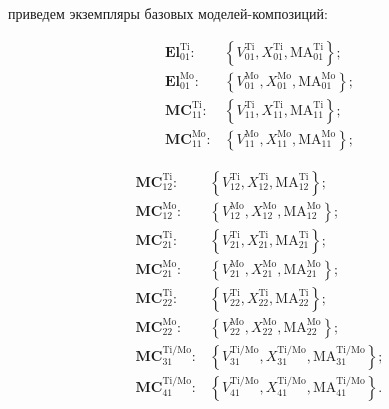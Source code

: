 \begin{multicols}{2}
\vspace*{-3pt}

\noindent
приведем экземпляры базовых мо\-де\-лей-ком\-по\-зи\-ций: 

\vspace*{-9pt}

\noindent
     \begin{align*}
     \mathbf{El}_{01}^{\mathrm{Ti}}:& \left\{ V_{01}^{\mathrm{Ti}}, 
X_{01}^{\mathrm{Ti}}, \mathrm{MA}_{01}^{\mathrm{Ti}}\right\};\\[-3pt]
     \mathbf{El}_{01}^{\mathrm{Mo}}:& \left\{ V_{01}^{\mathrm{Mo}}, 
X_{01}^{\mathrm{Mo}}, \mathrm{MA}_{01}^{\mathrm{Mo}}\right\};\\[-3pt]
\mathbf{MC}_{11}^{\mathrm{Ti}}:& \left\{ V_{11}^{\mathrm{Ti}}, 
X_{11}^{\mathrm{Ti}}, \mathrm{MA}_{11}^{\mathrm{Ti}}\right\};\\[-3pt]
\mathbf{MC}_{11}^{\mathrm{Mo}}:& \left\{ V_{11}^{\mathrm{Mo}}, 
X_{11}^{\mathrm{Mo}}, \mathrm{MA}_{11}^{\mathrm{Mo}}\right\};
\end{align*}

\noindent
\begin{align*}
               \mathbf{MC}_{12}^{\mathrm{Ti}}:& \left\{ V_{12}^{\mathrm{Ti}}, 
X_{12}^{\mathrm{Ti}}, \mathrm{MA}_{12}^{\mathrm{Ti}}\right\};\\
     \mathbf{MC}_{12}^{\mathrm{Mo}}:& \left\{ V_{12}^{\mathrm{Mo}}, 
X_{12}^{\mathrm{Mo}}, \mathrm{MA}_{12}^{\mathrm{Mo}}\right\};\\
     \mathbf{MC}_{21}^{\mathrm{Ti}}:& \left\{ V_{21}^{\mathrm{Ti}}, 
X_{21}^{\mathrm{Ti}}, \mathrm{MA}_{21}^{\mathrm{Ti}}\right\};\\
     \mathbf{MC}_{21}^{\mathrm{Mo}}:& \left\{ V_{21}^{\mathrm{Mo}}, 
X_{21}^{\mathrm{Mo}}, \mathrm{MA}_{21}^{\mathrm{Mo}}\right\};\\
     \mathbf{MC}_{22}^{\mathrm{Ti}}:& \left\{ V_{22}^{\mathrm{Ti}}, 
X_{22}^{\mathrm{Ti}}, \mathrm{MA}_{22}^{\mathrm{Ti}}\right\};\\
     \mathbf{MC}_{22}^{\mathrm{Mo}}:& \left\{ V_{22}^{\mathrm{Mo}}, 
X_{22}^{\mathrm{Mo}}, \mathrm{MA}_{22}^{\mathrm{Mo}}\right\};\\
     \mathbf{MC}_{31}^{\mathrm{Ti}/\mathrm{Mo}}:& \left\{
     V_{31}^{\mathrm{Ti}/\mathrm{Mo}}, X_{31}^{\mathrm{Ti}/\mathrm{Mo}}, 
\mathrm{MA}_{31}^{\mathrm{Ti}/\mathrm{Mo}}\right\};\\
     \mathbf{MC}_{41}^{\mathrm{Ti}/\mathrm{Mo}}:& \left\{
     V_{41}^{\mathrm{Ti}/\mathrm{Mo}}, X_{41}^{\mathrm{Ti}/\mathrm{Mo}}, 
\mathrm{MA}_{41}^{\mathrm{Ti}/\mathrm{Mo}}\right\}.
     \end{align*}
     

\end{multicols}
